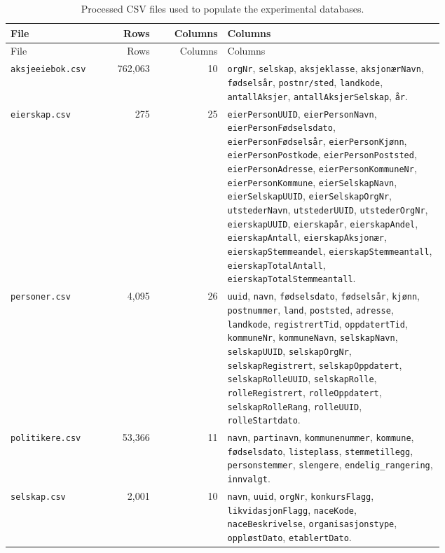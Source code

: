 \begin{longtable}{P{0.22\linewidth}rrP{0.50\linewidth}}
\caption{Processed CSV files used to populate the experimental databases.}
\label{tab:appendix-processed-csv-files}\\
\toprule
File & Rows & Columns & Columns \\
\midrule
\endfirsthead
\toprule
File & Rows & Columns & Columns \\
\midrule
\endhead
\bottomrule
\endfoot
\texttt{aksjeeiebok.csv} & 762,063 & 10 & \texttt{orgNr}, \texttt{selskap}, \texttt{aksjeklasse}, \texttt{aksjonærNavn}, \texttt{fødselsår}, \texttt{postnr/sted}, \texttt{landkode}, \texttt{antallAksjer}, \texttt{antallAksjerSelskap}, \texttt{år}. \\
\texttt{eierskap.csv} & 275 & 25 & \texttt{eierPersonUUID}, \texttt{eierPersonNavn}, \texttt{eierPersonFødselsdato}, \texttt{eierPersonFødselsår}, \texttt{eierPersonKjønn}, \texttt{eierPersonPostkode}, \texttt{eierPersonPoststed}, \texttt{eierPersonAdresse}, \texttt{eierPersonKommuneNr}, \texttt{eierPersonKommune}, \texttt{eierSelskapNavn}, \texttt{eierSelskapUUID}, \texttt{eierSelskapOrgNr}, \texttt{utstederNavn}, \texttt{utstederUUID}, \texttt{utstederOrgNr}, \texttt{eierskapUUID}, \texttt{eierskapår}, \texttt{eierskapAndel}, \texttt{eierskapAntall}, \texttt{eierskapAksjonær}, \texttt{eierskapStemmeandel}, \texttt{eierskapStemmeantall}, \texttt{eierskapTotalAntall}, \texttt{eierskapTotalStemmeantall}. \\
\texttt{personer.csv} & 4,095 & 26 & \texttt{uuid}, \texttt{navn}, \texttt{fødselsdato}, \texttt{fødselsår}, \texttt{kjønn}, \texttt{postnummer}, \texttt{land}, \texttt{poststed}, \texttt{adresse}, \texttt{landkode}, \texttt{registrertTid}, \texttt{oppdatertTid}, \texttt{kommuneNr}, \texttt{kommuneNavn}, \texttt{selskapNavn}, \texttt{selskapUUID}, \texttt{selskapOrgNr}, \texttt{selskapRegistrert}, \texttt{selskapOppdatert}, \texttt{selskapRolleUUID}, \texttt{selskapRolle}, \texttt{rolleRegistrert}, \texttt{rolleOppdatert}, \texttt{selskapRolleRang}, \texttt{rolleUUID}, \texttt{rolleStartdato}. \\
\texttt{politikere.csv} & 53,366 & 11 & \texttt{navn}, \texttt{partinavn}, \texttt{kommunenummer}, \texttt{kommune}, \texttt{fødselsdato}, \texttt{listeplass}, \texttt{stemmetillegg}, \texttt{personstemmer}, \texttt{slengere}, \texttt{endelig\_rangering}, \texttt{innvalgt}. \\
\texttt{selskap.csv} & 2,001 & 10 & \texttt{navn}, \texttt{uuid}, \texttt{orgNr}, \texttt{konkursFlagg}, \texttt{likvidasjonFlagg}, \texttt{naceKode}, \texttt{naceBeskrivelse}, \texttt{organisasjonstype}, \texttt{oppløstDato}, \texttt{etablertDato}. \\
\end{longtable}

